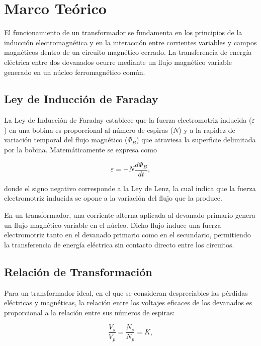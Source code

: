 \section{Marco Teórico}

El funcionamiento de un transformador se fundamenta en los principios de la inducción electromagnética y en la interacción entre corrientes variables y campos magnéticos dentro de un circuito magnético cerrado. La transferencia de energía eléctrica entre dos devanados ocurre mediante un flujo magnético variable generado en un núcleo ferromagnético común.

\subsection{Ley de Inducción de Faraday}

La Ley de Inducción de Faraday establece que la fuerza electromotriz inducida ($\varepsilon$) en una bobina es proporcional al número de espiras ($N$) y a la rapidez de variación temporal del flujo magnético ($\Phi_B$) que atraviesa la superficie delimitada por la bobina. Matemáticamente se expresa como

\begin{equation}
\varepsilon = -N \frac{d\Phi_B}{dt},
\end{equation}

donde el signo negativo corresponde a la Ley de Lenz, la cual indica que la fuerza electromotriz inducida se opone a la variación del flujo que la produce.

En un transformador, una corriente alterna aplicada al devanado primario genera un flujo magnético variable en el núcleo. Dicho flujo induce una fuerza electromotriz tanto en el devanado primario como en el secundario, permitiendo la transferencia de energía eléctrica sin contacto directo entre los circuitos.

\subsection{Relación de Transformación}

Para un transformador ideal, en el que se consideran despreciables las pérdidas eléctricas y magnéticas, la relación entre los voltajes eficaces de los devanados es proporcional a la relación entre sus números de espiras:

\begin{equation}
\frac{V_s}{V_p}
=
\frac{N_s}{N_p}
=
K,
\end{equation}

